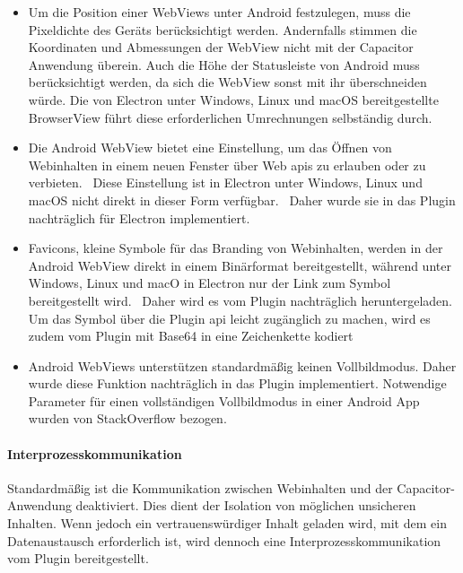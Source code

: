 \begin{itemize}
    \setlength\itemsep{-0.5em}
    \item
    Um die Position einer WebViews unter Android festzulegen, muss die Pixeldichte des Geräts berücksichtigt werden.
    Andernfalls stimmen die Koordinaten und Abmessungen der WebView nicht mit der Capacitor Anwendung überein.
    Auch die Höhe der Statusleiste von Android muss berücksichtigt werden, da sich die WebView sonst mit ihr überschneiden würde.
    Die von Electron unter Windows, Linux und macOS bereitgestellte BrowserView führt diese erforderlichen Umrechnungen selbständig durch.
    \item
    Die Android WebView bietet eine Einstellung, um das Öffnen von Webinhalten in einem neuen Fenster über Web \acp{api} zu erlauben oder zu verbieten.~\cite{android:api}
    Diese Einstellung ist in Electron unter Windows, Linux und macOS nicht direkt in dieser Form verfügbar.~\cite{electron:docs}
    Daher wurde sie in das Plugin nachträglich für Electron implementiert.
    \item
    Favicons, kleine Symbole für das Branding von Webinhalten, werden in der Android WebView direkt in einem Binärformat bereitgestellt,
    während unter Windows, Linux und macO in Electron nur der Link zum Symbol bereitgestellt wird.~\cite{android:api, electron:docs}
    Daher wird es vom Plugin nachträglich heruntergeladen.
    Um das Symbol über die Plugin \ac{api} leicht zugänglich zu machen, wird es zudem vom Plugin mit Base64 in eine Zeichenkette kodiert
    \item
    Android WebViews unterstützen standardmäßig keinen Vollbildmodus.
    Daher wurde diese Funktion nachträglich in das Plugin implementiert.
    Notwendige Parameter für einen vollständigen Vollbildmodus in einer Android App wurden von StackOverflow bezogen.
    \cite{android:api, stackoverflow}
\end{itemize}

\newpage

\paragraph{Interprozesskommunikation}

Standardmäßig ist die Kommunikation zwischen Webinhalten und der Capacitor-Anwendung deaktiviert.
Dies dient der Isolation von möglichen unsicheren Inhalten.
Wenn jedoch ein vertrauenswürdiger Inhalt geladen wird, mit dem ein Datenaustausch erforderlich ist, wird dennoch eine Interprozesskommunikation vom Plugin bereitgestellt.

